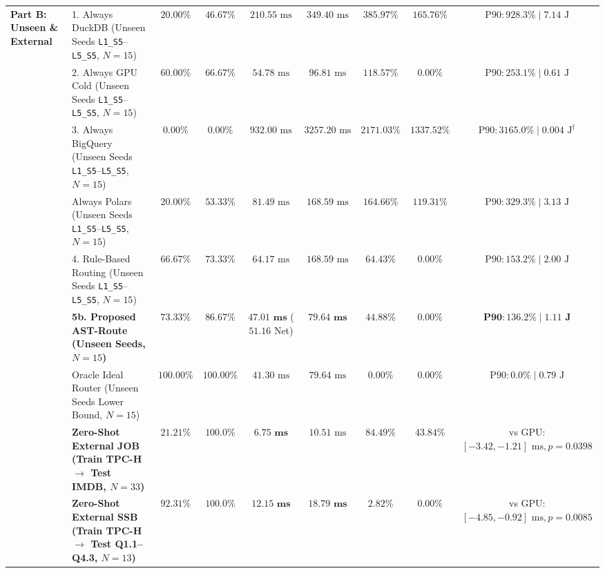 \documentclass[10pt,a4paper]{article}
\newenvironment{fitasttable}{%
  \begin{lrbox}{\asttblbox}%
}{%
  \end{lrbox}%
  \sbox{\asttblboxB}{%
    \ifdim\wd\asttblbox>0.96\textwidth
      \resizebox{0.96\textwidth}{!}{\usebox{\asttblbox}}%
    \else
      \usebox{\asttblbox}%
    \fi
  }%
  \ifdim\ht\asttblboxB>0.72\textheight
    \resizebox{!}{0.72\textheight}{\usebox{\asttblboxB}}%
  \else
    \usebox{\asttblboxB}%
  \fi
}
\begin{document}
\begin{table}[!htbp]
\begin{fitasttable}
\begin{tabular}{@{}llccccccc@{}}
\midrule
\multirow{9}{*}{\textbf{Part B: Unseen \& External}}
 & 1. Always DuckDB (Unseen Seeds \texttt{L1\_\allowbreak{}S5}--\texttt{L5\_\allowbreak{}S5}, $N=15$) & $20.00\%$ & $46.67\%$ & $210.55\text{ ms}$ & $349.40\text{ ms}$ & $385.97\%$ & $165.76\%$ & $\text{P90}: 928.3\% \mid 7.14\text{ J}$ \\
 & 2. Always GPU Cold (Unseen Seeds \texttt{L1\_\allowbreak{}S5}--\texttt{L5\_\allowbreak{}S5}, $N=15$) & $60.00\%$ & $66.67\%$ & $54.78\text{ ms}$ & $96.81\text{ ms}$ & $118.57\%$ & $0.00\%$ & $\text{P90}: 253.1\% \mid 0.61\text{ J}$ \\
 & 3. Always BigQuery (Unseen Seeds \texttt{L1\_\allowbreak{}S5}--\texttt{L5\_\allowbreak{}S5}, $N=15$) & $0.00\%$ & $0.00\%$ & $932.00\text{ ms}$ & $3257.20\text{ ms}$ & $2171.03\%$ & $1337.52\%$ & $\text{P90}: 3165.0\% \mid 0.004\text{ J}^{\dagger}$ \\
 & Always Polars (Unseen Seeds \texttt{L1\_\allowbreak{}S5}--\texttt{L5\_\allowbreak{}S5}, $N=15$) & $20.00\%$ & $53.33\%$ & $81.49\text{ ms}$ & $168.59\text{ ms}$ & $164.66\%$ & $119.31\%$ & $\text{P90}: 329.3\% \mid 3.13\text{ J}$ \\
 & 4. Rule-Based Routing (Unseen Seeds \texttt{L1\_\allowbreak{}S5}--\texttt{L5\_\allowbreak{}S5}, $N=15$) & $66.67\%$ & $73.33\%$ & $64.17\text{ ms}$ & $168.59\text{ ms}$ & $64.43\%$ & $0.00\%$ & $\text{P90}: 153.2\% \mid 2.00\text{ J}$ \\
 & \textbf{5b. Proposed AST-Route (Unseen Seeds, $N=15$)} & $\mathbf{73.33\%}$ & $\mathbf{86.67\%}$ & $\mathbf{47.01\text{ ms}}$ ($51.16$ Net) & $\mathbf{79.64\text{ ms}}$ & $\mathbf{44.88\%}$ & $\mathbf{0.00\%}$ & $\mathbf{\text{P90}: 136.2\% \mid 1.11\text{ J}}$ \\
 & Oracle Ideal Router (Unseen Seeds Lower Bound, $N=15$) & $100.00\%$ & $100.00\%$ & $41.30\text{ ms}$ & $79.64\text{ ms}$ & $0.00\%$ & $0.00\%$ & $\text{P90}: 0.0\% \mid 0.79\text{ J}$ \\
 & \textbf{Zero-Shot External JOB (Train TPC-H $\rightarrow$ Test IMDB, $N=33$)} & $21.21\%$ & $\mathbf{100.0\%}$ & $\mathbf{6.75\text{ ms}}$ & $10.51\text{ ms}$ & $84.49\%$ & $43.84\%$ & vs GPU: $[-3.42,-1.21]\text{ ms}, p=0.0398$ \\
 & \textbf{Zero-Shot External SSB (Train TPC-H $\rightarrow$ Test Q1.1--Q4.3, $N=13$)} & $\mathbf{92.31\%}$ & $\mathbf{100.0\%}$ & $\mathbf{12.15\text{ ms}}$ & $\mathbf{18.79\text{ ms}}$ & $\mathbf{2.82\%}$ & $\mathbf{0.00\%}$ & vs GPU: $[-4.85,-0.92]\text{ ms}, p=0.0085$ \\

\end{tabular}
\end{fitasttable}
\end{table}
\end{document}
